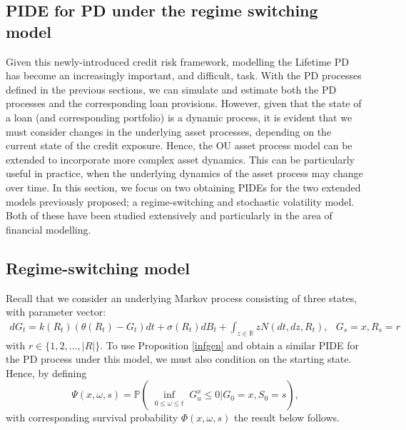 \documentclass[11pt,reqno]{article}
\theoremstyle{definition}
\begin{document}
\subsection{PIDE for PD under the regime switching model}
\par Given this newly-introduced credit risk framework, modelling the Lifetime PD has become an increasingly important, and difficult, task. With the PD processes defined in the previous sections, we can simulate and estimate both the PD processes and the corresponding loan provisions. However, given that the state of a loan (and corresponding portfolio) is a dynamic process, it is evident that we must consider changes in the underlying asset processes, depending on the current state of the credit exposure. Hence, the OU asset process model can be extended to incorporate more complex asset dynamics. This can be particularly useful in practice, when the underlying dynamics of the asset process may change over time. In this section, we focus on two obtaining PIDEs for the two extended models previously proposed; a regime-switching and stochastic volatility model. Both of these have been studied extensively and particularly in the area of financial modelling.
\subsection{Regime-switching model} 

\par Recall that we consider an underlying Markov process consisting of three states, with parameter vector:
 \begin{eqnarray}\label{gou_rs}
 	dG_t=k(R_t)(\theta(R_t) - G_t)dt + \sigma(R_t) dB_t +  \int_{z\in \mathbb{R}} z N(dt,dz,R_t), \,\,\,\ G_s =x, R_s = r 
 \end{eqnarray}
 with $r \in \{1,2,\dots, |R|\}$.
To use Proposition \ref{infgen} and obtain a similar PIDE for the PD process under this model, we must also condition on the starting state. Hence, by defining
$$ \Psi(x,\omega,s)= \mathbb{P}(\inf_{\substack{0 \leq \omega \leq t}} G_u^x \leq 0| G_0=x, S_0 = s), $$ with corresponding survival probability $\Phi(x,\omega,s)$ the result below follows.
\end{document}
